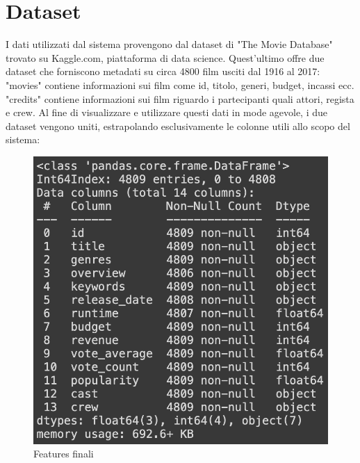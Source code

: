 \documentclass{report}
\begin{document}
    \section{Dataset}
        I dati utilizzati dal sistema provengono dal dataset di "The Movie Database" trovato su Kaggle.com, piattaforma di data science. Quest'ultimo offre due dataset che forniscono metadati su circa 4800 film usciti dal 1916 al 2017: \\
        "movies" contiene informazioni sui film come id, titolo, generi, budget, incassi ecc. \\
        "credits" contiene informazioni sui film riguardo i partecipanti quali attori, regista e crew. Al fine di visualizzare e utilizzare questi dati in mode agevole, i due dataset vengono uniti, estrapolando esclusivamente le colonne utili allo scopo del sistema:
        \begin{figure}[h]
            \centering
            \includegraphics[width=0.5\linewidth]{screenshot/movies.info().png}
            \caption{Features finali}
            \label{fig:enter-label}
        \end{figure}
        
\end{document}
